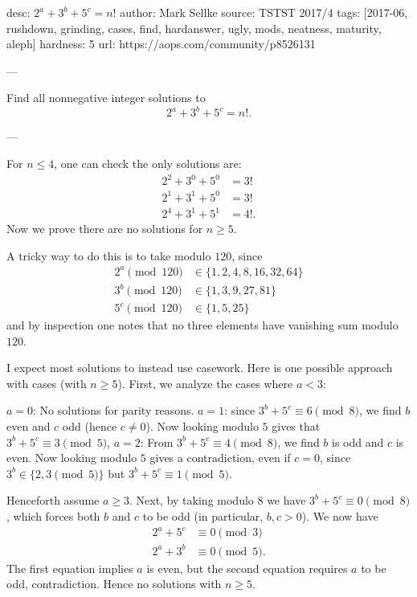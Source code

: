 desc: $2^a+3^b+5^c=n!$
author: Mark Sellke
source: TSTST 2017/4
tags: [2017-06, rushdown, grinding, cases, find, hardanswer, ugly, mods, neatness, maturity, aleph]
hardness: 5
url: https://aops.com/community/p8526131

---

Find all nonnegative integer solutions to \[ 2^a + 3^b + 5^c = n!. \]

---

For $n \le 4$, one can check the only solutions are:
\begin{align*}
  2^2 + 3^0 + 5^0 &= 3! \\
  2^1 + 3^1 + 5^0 &= 3! \\
  2^4 + 3^1 + 5^1 &= 4!.
\end{align*}
Now we prove there are no solutions for $n \ge 5$.

A tricky way to do this is to take modulo $120$, since
\begin{align*}
  2^a \pmod{120} &\in \{ 1, 2, 4, 8, 16, 32, 64 \} \\
  3^b \pmod{120} &\in \{ 1, 3, 9, 27, 81 \} \\
  5^c \pmod{120} &\in \{ 1, 5, 25 \}
\end{align*}
and by inspection one notes that no three
elements have vanishing sum modulo $120$.

I expect most solutions to instead use casework.
Here is one possible approach with cases (with $n \ge 5$).
First, we analyze the cases where $a < 3$:
\begin{itemize}
  \ii $a=0$: No solutions for parity reasons.
  \ii $a=1$: since $3^b + 5^c \equiv 6 \pmod 8$,
  we find $b$ even and $c$ odd (hence $c \neq 0$).
  Now looking modulo $5$ gives that $3^b + 5^c \equiv 3 \pmod 5$,
  \ii $a=2$: From $3^b + 5^c \equiv 4 \pmod 8$,
  we find $b$ is odd and $c$ is even.
  Now looking modulo $5$ gives a contradiction,
  even if $c = 0$,
  since $3^b \in \{2,3 \pmod 5\}$ but $3^b + 5^c \equiv 1 \pmod 5$.
\end{itemize}
Henceforth assume $a \ge 3$.
Next, by taking modulo $8$ we have $3^b+5^c \equiv 0 \pmod 8$,
which forces both $b$ and $c$ to be odd (in particular, $b,c > 0$).
We now have
\begin{align*}
  2^a + 5^c &\equiv 0 \pmod 3 \\
  2^a + 3^b &\equiv 0 \pmod 5.
\end{align*}
The first equation implies $a$ is even,
but the second equation requires $a$ to be odd, contradiction.
Hence no solutions with $n \ge 5$.
